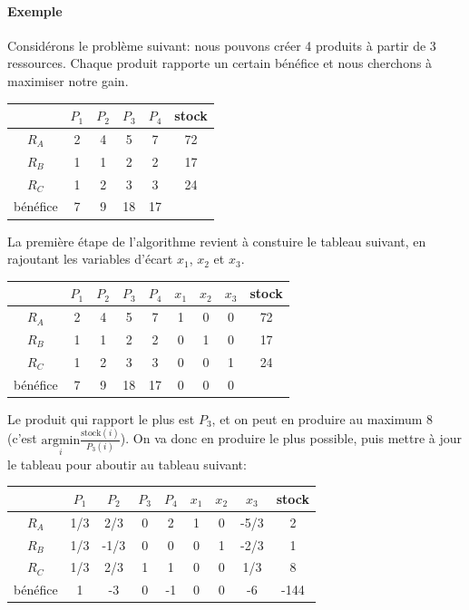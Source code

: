     \paragraph{Exemple}
      Considérons le problème suivant: nous pouvons créer 4 produits à partir
      de 3 ressources. Chaque produit rapporte un certain bénéfice et nous
      cherchons à maximiser notre gain.  
      \begin{center}
        \begin{tabular}{|c|cccc|c|}\hline
          & $P_1$ & $P_2$ & $P_3$ & $P_4$ & stock \\ \hline
          $R_A$ & 2 & 4 & 5 & 7 & 72 \\
          $R_B$ & 1 & 1 & 2 & 2 & 17 \\
          $R_C$ & 1 & 2 & 3 & 3 & 24 \\ \hline
          bénéfice & 7 & 9 & 18 & 17 &  \\ \hline
        \end{tabular}
      \end{center}

      La première étape de l'algorithme revient à constuire le tableau suivant,
      en rajoutant les variables d'écart $x_1$, $x_2$ et $x_3$.

      \begin{center}
        \begin{tabular}{|c|ccccccc|c|}\hline
          & $P_1$ & $P_2$ & $P_3$ & $P_4$ & $x_1$ & $x_2$ & $x_3$ & stock \\ \hline
          $R_A$ & 2 & 4 & 5 & 7 & 1 & 0 & 0 & 72 \\
          $R_B$ & 1 & 1 & 2 & 2 & 0 & 1 & 0 & 17 \\
          $R_C$ & 1 & 2 & 3 & 3 & 0 & 0 & 1 & 24 \\ \hline
          bénéfice & 7 & 9 & 18 & 17 & 0 & 0 & 0 & \\ \hline
        \end{tabular}
      \end{center}

      Le produit qui rapport le plus est $P_3$, et on peut en produire au
      maximum 8 (c'est $\underset{i}{\text{argmin}}
      \frac{\text{stock}(i)}{P_3(i)}$). On va donc en produire le plus
      possible, puis mettre à jour le tableau pour aboutir au tableau suivant:

      \begin{center}
        \begin{tabular}{|c|ccccccc|c|}\hline
          & $P_1$ & $P_2$ & $P_3$ & $P_4$ & $x_1$ & $x_2$ & $x_3$ & stock \\ \hline
          $R_A$ & 1/3 & 2/3 & 0 & 2 & 1 & 0 & -5/3 & 2 \\
          $R_B$ & 1/3 & -1/3 & 0 & 0 & 0 & 1 & -2/3 & 1 \\
          $R_C$ & 1/3 & 2/3 & 1 & 1 & 0 & 0 & 1/3 & 8 \\ \hline
          bénéfice & 1 & -3 & 0 & -1 & 0 & 0 & -6 & -144 \\ \hline
        \end{tabular}
      \end{center}

